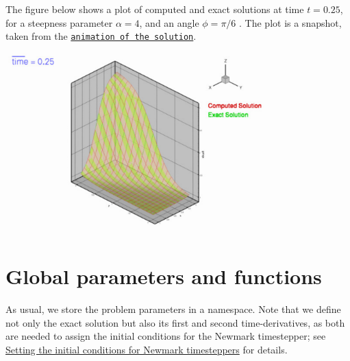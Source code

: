 The figure below shows a plot of computed and exact solutions at time $ t = 0.25 $, for a steepness parameter $ \alpha=4 $, and an angle $ \phi=\pi/6 $ . The plot is a snapshot, taken from the \href{../figures/wave_sol.avi}{\tt animation of the solution}.

 
\begin{DoxyImage}
\includegraphics[width=0.75\textwidth]{wave_sol}
\end{DoxyImage}




 

\hypertarget{index_namespace}{}\section{Global parameters and functions}\label{index_namespace}
As usual, we store the problem parameters in a namespace. Note that we define not only the exact solution but also its first and second time-\/derivatives, as both are needed to assign the initial conditions for the Newmark timestepper; see \hyperlink{index_IC}{Setting the initial conditions for Newmark timesteppers} for details.

